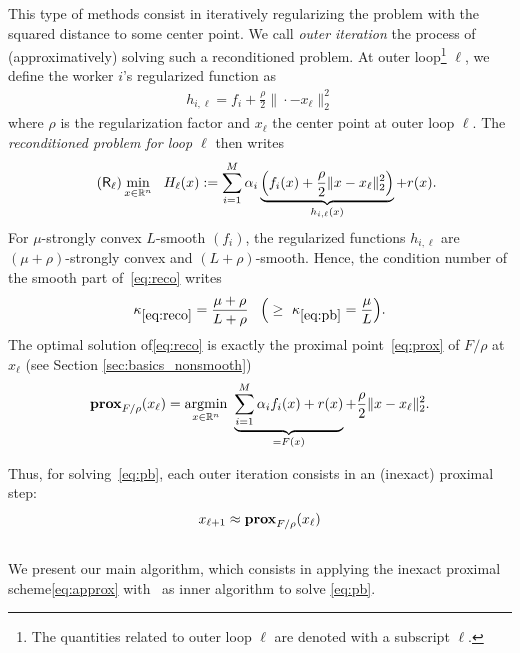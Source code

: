 This type of methods consist in iteratively regularizing the problem with the squared distance to some center point. We call \emph{outer iteration} the process of (approximatively) solving such a reconditioned problem. At outer loop\footnote{The quantities related to outer loop $\ell$ are denoted with a subscript $\ell$.} $\ell$, we define the worker $i$'s regularized function as 
\begin{align*}
    h_{i,\ell} =  f_i + \frac{\rho}{2} \| \cdot - x_\ell \|_2^2 
\end{align*}
where $\rho$ is the regularization factor and $x_\ell$ the center point at outer loop $\ell$. The \emph{reconditioned problem for loop $\ell$} then writes
\begin{align}\label{eq:reco}
\tag{$\mathsf{R}_\ell$}
& \min_{x\in\mathbb{R}^n}  ~~ H_\ell(x)  :=  \sum_{i=1}^M  \alpha_i \underbrace{\left( f_i(x) + \frac{\rho}{2} \| x - x_\ell \|_2^2 \right)}_{h_{i,\ell}(x)}  +  r(x) .
\end{align}
For $\mu$-strongly convex $L$-smooth $(f_i)$, the regularized functions $h_{i,\ell}$ are $(\mu+\rho)$-strongly convex and $(L+\rho)$-smooth. Hence, the condition number of the smooth part of~\eqref{eq:reco} writes
\begin{align*}
   \kappa_{\eqref{eq:reco}} = \frac{\mu + \rho}{L+\rho}\, ~~\Big(\geq~\kappa_{\eqref{eq:pb}} = \frac{\mu}{L}\Big).
\end{align*}
The optimal solution of\;\eqref{eq:reco} is exactly the proximal point~\eqref{eq:prox} of $F/\rho$ at $x_\ell$ (see Section \ref{sec:basics_nonsmooth})
\begin{align*}
\mathbf{prox}_{F/\rho} (x_\ell) = \operatorname*{argmin}_{x\in\mathbb{R}^n}  ~ \underbrace{  \sum_{i=1}^M \alpha_i f_i(x) +  r(x)}_{= F(x)} +  \frac{\rho}{2} \| x- x_\ell \|_2^2.
\end{align*}

Thus, for solving~\eqref{eq:pb}, each outer iteration consists in an (inexact) proximal step:
\begin{align}
\label{eq:approx}
    x_{\ell+1} \approx \mathbf{prox}_{F/\rho} (x_\ell) 
\end{align}

\subsection{\recoalgo}\label{sec:recoalgo}

We present our main algorithm, which consists in applying the inexact proximal scheme\;\eqref{eq:approx} with \spyI~as inner algorithm to solve \eqref{eq:pb}. 


